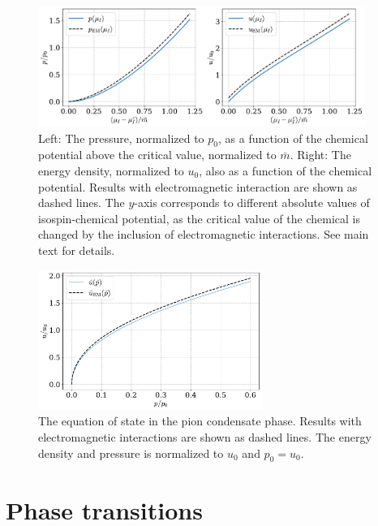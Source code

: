 \begin{figure}[!htb]
    \centering
    \includegraphics[width=0.95\textwidth]{../scripts/figurer/pion_star/pion_up.pdf}
    \caption{
        Left: The pressure, normalized to $p_0$, as a function of the chemical potential above the critical value, normalized to $\bar m$.
        Right: The energy density, normalized to $u_0$, also as a function of the chemical potential.
        Results with electromagnetic interaction are shown as dashed lines.
        The $y$-axis corresponds to different absolute values of isospin-chemical potential, as the critical value of the chemical is changed by the inclusion of electromagnetic interactions. See main text for details.
        }
        \label{fig: pressure and energy with EM interaction}
\end{figure}



\begin{figure}[!htb]
    \centering
    \includegraphics[width=0.65\textwidth]{../scripts/figurer/pion_star/pion_eos_EM.pdf}
    \caption{
        The equation of state in the pion condensate phase. 
        Results with electromagnetic interactions are shown as dashed lines.
        The energy density and pressure is normalized to $u_0$ and $p_0 = u_0$.
        }
    \label{fig: eos chpt em interaction}
\end{figure}





\section{Phase transitions}


